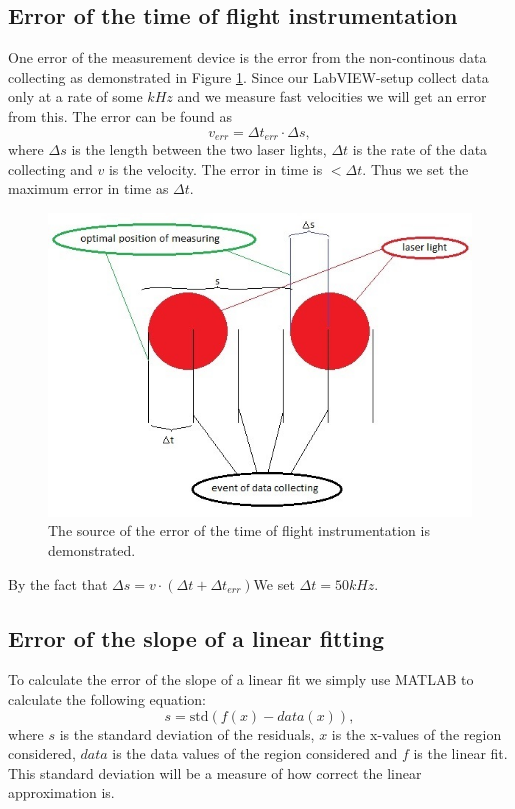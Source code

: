 \documentclass[11pt, a4paper]{article}
\begin{document}
\subsection{Error of the time of flight instrumentation}
One error of the measurement device is the error from the non-continous data collecting as demonstrated in Figure \ref{f:lasercloseup}.
Since our LabVIEW-setup collect data only at a rate of some $kHz$ and we measure fast velocities we will get an error from this. The error can be found as
\[
	v_{err}=\Delta t_{err}\cdot \Delta s,
\]
where $\Delta s$ is the length between the two laser lights, $\Delta t$ is the rate of the data collecting and $v$ is the velocity. The error in time is $<\Delta t$. Thus we set the maximum error in time as $\Delta t$.
\begin{figure}[h]
	\centering
	\includegraphics{errorofdevice}
	\caption{The source of the error of the time of flight instrumentation is demonstrated.}
	\label{f:lasercloseup}
\end{figure}
By the fact that $\Delta s = v\cdot (\Delta t + \Delta t_{err})$We set $\Delta t = 50kHz$.


\subsection{Error of the slope of a linear fitting}
To calculate the error of the slope of a linear fit we simply use MATLAB to calculate the following equation:
\begin{equation}
	s = \text{std}(f(x)-data(x)),
	\label{e:std}
\end{equation}
where $s$ is the standard deviation of the residuals, $x$ is the x-values of the region considered, $data$ is the data values of the region considered and $f$ is the linear fit.
This standard deviation will be a measure of how correct the linear approximation is.
\end{document}
